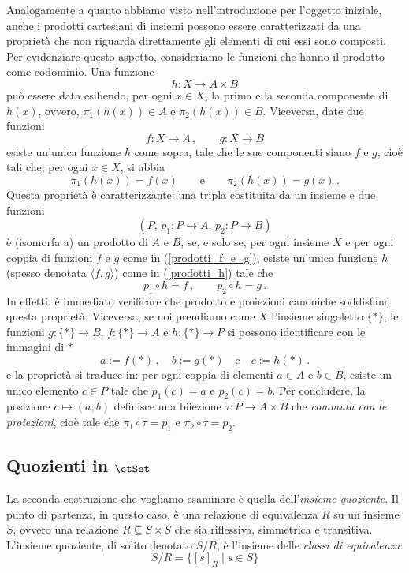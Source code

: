Analogamente a quanto abbiamo visto nell'introduzione per l'oggetto iniziale, anche i prodotti cartesiani di insiemi possono essere caratterizzati da una proprietà che non riguarda direttamente gli elementi di cui essi sono composti. Per evidenziare questo aspetto, consideriamo le funzioni che hanno il prodotto come codominio. Una funzione
\begin{equation}\label{prodotti_h}
	h\colon X\to A\times B
\end{equation}
può essere data esibendo, per ogni \(x\in X\), la prima e la seconda componente di \(h(x)\), ovvero, \(\pi_1(h(x))\in A\) e \(\pi_2(h(x))\in B\). Viceversa, date due funzioni
\begin{equation}\label{prodotti_f_e_g}
	f\colon X\to A\,,\qquad g\colon X\to B
\end{equation}
esiste un'unica funzione \(h\) come sopra, tale che le sue componenti siano \(f\) e \(g\), cioè tali che, per ogni \(x\in X\), si abbia
\[
	\pi_1(h(x))=f(x)\qquad\text{e}\qquad \pi_2(h(x))=g(x)\,.
\]
Questa proprietà è caratterizzante: una tripla costituita da un insieme e due funzioni
\[
	(P,\,  p_1\colon P\to A,\,  p_2\colon P\to B)
\]
è (isomorfa a) un prodotto di \(A\) e \(B\), se, e solo se, per ogni insieme \(X\) e per ogni coppia di funzioni \(f\) e \(g\) come in (\ref{prodotti_f_e_g}), esiste un'unica funzione \(h\) (spesso denotata \(\langle f,g\rangle\)) come in (\ref{prodotti_h}) tale che
\[
	p_1\circ h = f\,,\qquad p_2\circ h=g\,.
\]
In effetti, è immediato verificare che prodotto e proiezioni canoniche soddisfano questa proprietà. Viceversa, se noi prendiamo come \(X\) l'insieme singoletto \(\{*\}\),  le funzioni \(g\colon \{*\}\to B\), \(f\colon \{*\}\to A\)  e \(h\colon \{*\}\to P\) si possono identificare con le immagini di \(*\)
\[
	a:= f(*)\,,\quad  b:= g(*) \quad \text{e}\quad c:= h(*)\,.
\]
e la proprietà si traduce in: per ogni coppia di elementi \(a\in A\) e \(b\in B\), esiste un unico elemento \(c\in P\) tale che \(p_1(c)=a\) e \(p_2(c)=b\). Per concludere, la posizione \(c\mapsto (a,b)\) definisce una biiezione \(\tau \colon P\to A\times B\) che \emph{commuta con le proiezioni}, cioè tale che \(\pi_1\circ \tau =p_1\) e \(\pi_2\circ \tau =p_2\).

\subsection*{Quozienti in \(\ctSet\)}\label{quoz_in_set}
La seconda costruzione che vogliamo esaminare è quella dell'\emph{insieme quoziente}. Il punto di partenza, in questo caso, è una relazione di equivalenza \(R\) su un insieme \(S\), ovvero una relazione \(R\subseteq S\times S\) che sia riflessiva, simmetrica e transitiva. L'insieme quoziente, di solito denotato \(S/R\), è l'insieme delle \emph{classi di equivalenza}:
\[
	S/R=\{[s]_R\mid s\in S\}
\]

